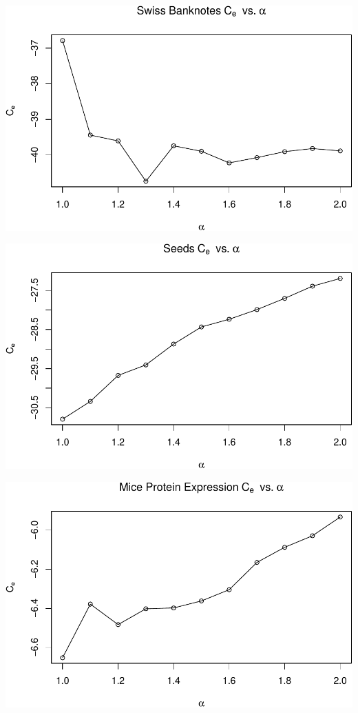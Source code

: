 \begin{center}\includegraphics[width=1\linewidth]{Report_files/figure-latex/unnamed-chunk-22-4} \end{center}

\begin{center}\includegraphics[width=1\linewidth]{Report_files/figure-latex/unnamed-chunk-22-5} \end{center}

\begin{center}\includegraphics[width=1\linewidth]{Report_files/figure-latex/unnamed-chunk-22-6} \end{center}

